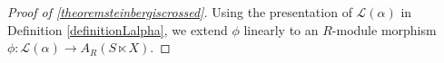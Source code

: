 \begin{proof}[Proof of \ref{theoremsteinbergiscrossed}]
Using the presentation of $\mathscr{L}(\alpha)$ in Definition \ref{definitionLalpha}, we extend $\phi$ linearly to an $R$-module morphism $\phi:\mathscr{L}(\alpha)\to A_R(S\ltimes X)$. %
%
%
%
%
%

\end{proof}
